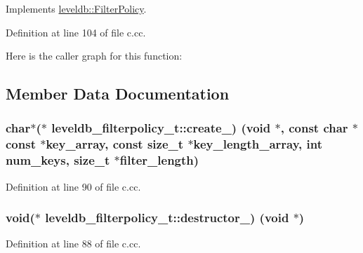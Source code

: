 Implements \hyperlink{classleveldb_1_1_filter_policy_afd5e951892a2e740f186c0658913ea1b}{leveldb\+::\+Filter\+Policy}.



Definition at line 104 of file c.\+cc.



Here is the caller graph for this function\+:




\subsection{Member Data Documentation}
\hypertarget{structleveldb__filterpolicy__t_a170514ed800318edc4d296e061d5e813}{}
\subsubsection[{create\+\_\+}]{\setlength{\rightskip}{0pt plus 5cm}char$\ast$($\ast$ leveldb\+\_\+filterpolicy\+\_\+t\+::create\+\_\+) (void $\ast$, const char $\ast$const $\ast$key\+\_\+array, const size\+\_\+t $\ast$key\+\_\+length\+\_\+array, int num\+\_\+keys, size\+\_\+t $\ast$filter\+\_\+length)}\label{structleveldb__filterpolicy__t_a170514ed800318edc4d296e061d5e813}


Definition at line 90 of file c.\+cc.

\hypertarget{structleveldb__filterpolicy__t_ac743c53a14a4061cf30832a1861573ed}{}
\subsubsection[{destructor\+\_\+}]{\setlength{\rightskip}{0pt plus 5cm}void($\ast$ leveldb\+\_\+filterpolicy\+\_\+t\+::destructor\+\_\+) (void $\ast$)}\label{structleveldb__filterpolicy__t_ac743c53a14a4061cf30832a1861573ed}


Definition at line 88 of file c.\+cc.

\hypertarget{structleveldb__filterpolicy__t_a453f04cb3420879256c6194b5de0a818}{}
